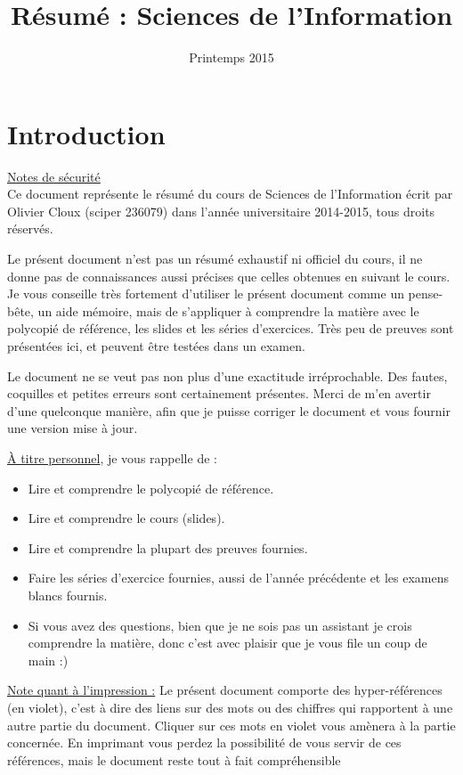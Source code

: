 \documentclass[11pt,a4paper]{article}
\date{Printemps 2015}
\title{Résumé : Sciences de l'Information}
\renewcommand{\)}{\right)}
\renewcommand{\(}{\left(}
\begin{document}
\maketitle
\begin{multicols}{2}
\tableofcontents
\end{multicols}
\newpage
{}
\setcounter{section}{-1}
\section{Introduction}
\uline{Notes de sécurité}\\
Ce document représente le résumé du cours de Sciences de l'Information écrit par Olivier Cloux (sciper 236079) dans l'année universitaire 2014-2015, tous droits réservés. 

Le présent document n'est pas un résumé exhaustif ni officiel du cours, il ne donne pas de connaissances aussi précises que celles obtenues en suivant le cours. Je vous conseille très fortement d'utiliser le présent document comme un pense-bête, un aide mémoire, mais de s'appliquer à comprendre la matière avec le polycopié de référence, les slides et les séries d'exercices. Très peu de preuves sont présentées ici, et peuvent être testées dans un examen.

Le document ne se veut pas non plus d'une exactitude irréprochable. Des fautes, coquilles et petites erreurs sont certainement présentes. Merci de m'en avertir d'une quelconque manière, afin que je puisse corriger le document et vous fournir une version mise à jour.

\uline{À titre personnel}, je vous rappelle de :
\begin{itemize}
	\item 	Lire et comprendre le polycopié de référence.
	\item 	Lire et comprendre le cours (slides).
	\item 	Lire et comprendre la plupart des preuves fournies.
	\item 	Faire les séries d'exercice fournies, aussi de l'année précédente et les examens blancs fournis.
	\item 	Si vous avez des questions, bien que je ne sois pas un assistant je crois comprendre la matière, donc c'est avec plaisir que je vous file un coup de main :)
\end{itemize}

\uline{Note quant à l'impression :} Le présent document comporte des hyper-références (en violet), c'est à dire des liens sur des mots ou des chiffres qui rapportent à une autre partie du document. Cliquer sur ces mots en violet vous amènera à la partie concernée. En imprimant vous perdez la possibilité de vous servir de ces références, mais le document reste tout à fait compréhensible
\end{document}
